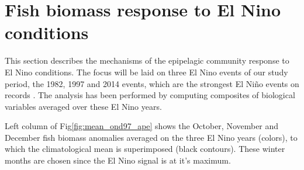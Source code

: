 \section{Fish biomass response to El Nino conditions}

This section describes the mechanisms of the epipelagic community response to El Nino conditions.
The focus will be laid on three El Nino events of our study period, the 1982, 1997 and 2014 events, which are the strongest El Niño events on records \citep{santosoDefiningCharacteristicsENSO2017}. The analysis has been performed by computing composites of biological variables averaged over these El Nino years.

%
%

Left column of Fig\ref{fig:mean_ond97_ape} shows the October, November and December fish biomass anomalies averaged on the three El Nino years (colors), to which the climatological mean is superimposed (black contours). These winter months are chosen since the El Nino signal is at it's maximum.

